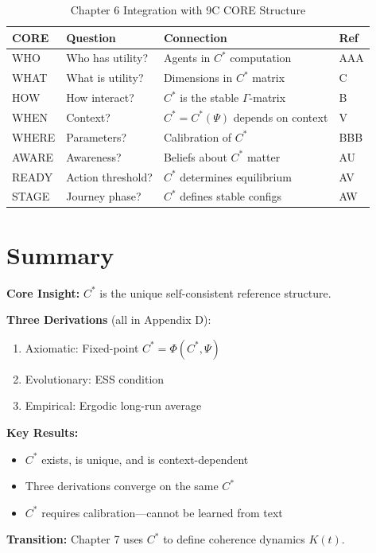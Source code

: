 \begin{table}[htbp]
\centering
\caption{Chapter 6 Integration with 9C CORE Structure}
\label{tab:ch6-8c-integration}
\small
\begin{tabular}{@{}llp{5cm}l@{}}
\toprule
\textbf{CORE} & \textbf{Question} & \textbf{Connection} & \textbf{Ref} \\
\midrule
\cellcolor{purple!20}WHO & Who has utility? & Agents in $C^*$ computation & AAA \\
\cellcolor{red!20}WHAT & What is utility? & Dimensions in $C^*$ matrix & C \\
\cellcolor{blue!20}HOW & How interact? & $C^*$ is the stable $\Gamma$-matrix & B \\
\cellcolor{green!20}WHEN & Context? & $C^* = C^*(\Psi)$ depends on context & V \\
\cellcolor{gray!20}WHERE & Parameters? & Calibration of $C^*$ & BBB \\
\cellcolor{orange!20}AWARE & Awareness? & Beliefs about $C^*$ matter & AU \\
\cellcolor{violet!20}READY & Action threshold? & $C^*$ determines equilibrium & AV \\
\cellcolor{teal!20}STAGE & Journey phase? & $C^*$ defines stable configs & AW \\
\bottomrule
\end{tabular}
\end{table}



\section{Summary}
\label{sec:cstar-summary}

\begin{tcolorbox}[
    colback=blue!5!white,
    colframe=blue!75!black,
    title={\textbf{Chapter 6 Summary}}
]
\textbf{Core Insight:} $C^*$ is the unique self-consistent reference structure.

\textbf{Three Derivations} (all in Appendix D):
\begin{enumerate}[nosep]
    \item Axiomatic: Fixed-point $C^* = \Phi(C^*, \Psi)$
    \item Evolutionary: ESS condition
    \item Empirical: Ergodic long-run average
\end{enumerate}

\textbf{Key Results:}
\begin{itemize}[nosep]
    \item $C^*$ exists, is unique, and is context-dependent
    \item Three derivations converge on the same $C^*$
    \item $C^*$ requires calibration---cannot be learned from text
\end{itemize}

\textbf{Transition:} Chapter 7 uses $C^*$ to define coherence dynamics $K(t)$.
\end{tcolorbox}

